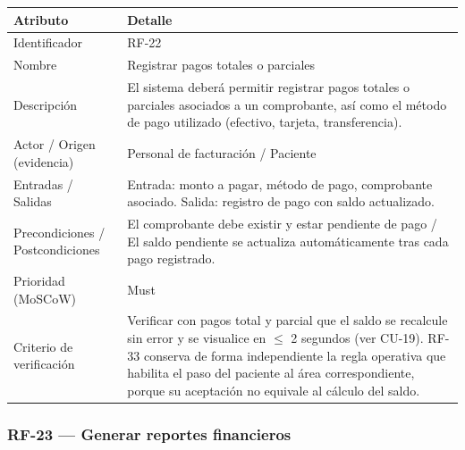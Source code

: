 \documentclass[11pt,a4paper]{article}
\begin{document}
	\begin{longtable}{p{} p{}}
		
		\toprule
		\textbf{Atributo} & \textbf{Detalle} \\
		\midrule
		\endhead
		
		Identificador & RF-22 \\
		Nombre & Registrar pagos totales o parciales \\
		Descripción & El sistema deberá permitir registrar pagos totales o parciales asociados a un comprobante, así como el método de pago utilizado (efectivo, tarjeta, transferencia). \\
		Actor / Origen (evidencia) & Personal de facturación / Paciente \\
		Entradas / Salidas & Entrada: monto a pagar, método de pago, comprobante asociado. Salida: registro de pago con saldo actualizado. \\
		Precondiciones / Postcondiciones & El comprobante debe existir y estar pendiente de pago / El saldo pendiente se actualiza automáticamente tras cada pago registrado. \\
		Prioridad (MoSCoW) & Must \\
		Criterio de verificación & Verificar con pagos total y parcial que el saldo se recalcule sin error y se visualice en \(\leq\) 2 segundos (ver CU-19). RF-33 conserva de forma independiente la regla operativa que habilita el paso del paciente al área correspondiente, porque su aceptación no equivale al cálculo del saldo. \\
		\bottomrule
	\end{longtable}
	
	\subsubsection{RF-23 --- Generar reportes financieros}
	
\end{document}
